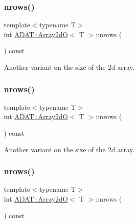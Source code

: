 \mbox{\label{classADAT_1_1Array2dO_a8c2e98f898dd0406c9ac9c9e04b1eb0d}} 
\subsubsection{\texorpdfstring{nrows()}{nrows()}\hspace{0.1cm}{\footnotesize\ttfamily [1/3]}}
{\footnotesize\ttfamily template$<$typename T$>$ \\
int \mbox{\hyperlink{classADAT_1_1Array2dO}{A\+D\+A\+T\+::\+Array2dO}}$<$ T $>$\+::nrows (\begin{DoxyParamCaption}{ }\end{DoxyParamCaption}) const\hspace{0.3cm}{\ttfamily [inline]}}



Another variant on the size of the 2d array. 

\mbox{\label{classADAT_1_1Array2dO_a8c2e98f898dd0406c9ac9c9e04b1eb0d}} 
\subsubsection{\texorpdfstring{nrows()}{nrows()}\hspace{0.1cm}{\footnotesize\ttfamily [2/3]}}
{\footnotesize\ttfamily template$<$typename T$>$ \\
int \mbox{\hyperlink{classADAT_1_1Array2dO}{A\+D\+A\+T\+::\+Array2dO}}$<$ T $>$\+::nrows (\begin{DoxyParamCaption}{ }\end{DoxyParamCaption}) const\hspace{0.3cm}{\ttfamily [inline]}}



Another variant on the size of the 2d array. 

\mbox{\label{classADAT_1_1Array2dO_a8c2e98f898dd0406c9ac9c9e04b1eb0d}} 
\subsubsection{\texorpdfstring{nrows()}{nrows()}\hspace{0.1cm}{\footnotesize\ttfamily [3/3]}}
{\footnotesize\ttfamily template$<$typename T$>$ \\
int \mbox{\hyperlink{classADAT_1_1Array2dO}{A\+D\+A\+T\+::\+Array2dO}}$<$ T $>$\+::nrows (\begin{DoxyParamCaption}{ }\end{DoxyParamCaption}) const\hspace{0.3cm}{\ttfamily [inline]}}



